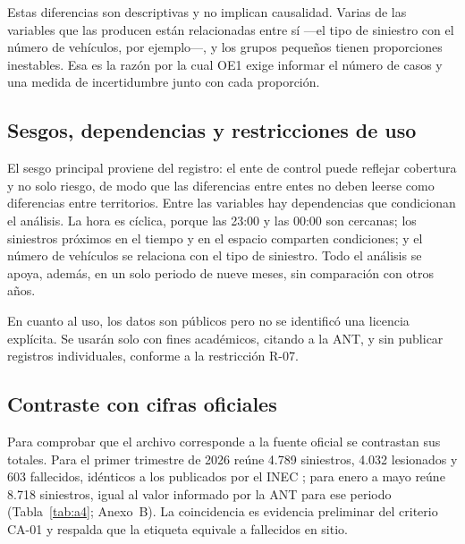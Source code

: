 Estas diferencias son descriptivas y no implican causalidad. Varias de las variables que las producen están relacionadas entre sí ---el tipo de siniestro con el número de vehículos, por ejemplo---, y los grupos pequeños tienen proporciones inestables. Esa es la razón por la cual OE1 exige informar el número de casos y una medida de incertidumbre junto con cada proporción.

\subsection{Sesgos, dependencias y restricciones de uso}

El sesgo principal proviene del registro: el ente de control puede reflejar cobertura y no solo riesgo, de modo que las diferencias entre entes no deben leerse como diferencias entre territorios. Entre las variables hay dependencias que condicionan el análisis. La hora es cíclica, porque las 23:00 y las 00:00 son cercanas; los siniestros próximos en el tiempo y en el espacio comparten condiciones; y el número de vehículos se relaciona con el tipo de siniestro. Todo el análisis se apoya, además, en un solo periodo de nueve meses, sin comparación con otros años.

En cuanto al uso, los datos son públicos pero no se identificó una licencia explícita. Se usarán solo con fines académicos, citando a la ANT, y sin publicar registros individuales, conforme a la restricción R-07.

\subsection{Contraste con cifras oficiales}

Para comprobar que el archivo corresponde a la fuente oficial se contrastan sus totales. Para el primer trimestre de 2026 reúne 4.789 siniestros, 4.032 lesionados y 603 fallecidos, idénticos a los publicados por el INEC \cite{ref1}; para enero a mayo reúne 8.718 siniestros, igual al valor informado por la ANT para ese periodo \cite{ref7} (Tabla~\ref{tab:a4}; Anexo~B). La coincidencia es evidencia preliminar del criterio CA-01 y respalda que la etiqueta equivale a fallecidos en sitio.
